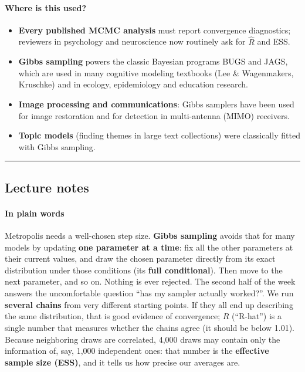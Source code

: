 \paragraph{Where is this used?}

\begin{itemize}
\tightlist
\item
  \textbf{Every published MCMC analysis} must report convergence
  diagnostics; reviewers in psychology and neuroscience now routinely
  ask for \(\hat R\) and ESS.
\item
  \textbf{Gibbs sampling} powers the classic Bayesian programs BUGS and
  JAGS, which are used in many cognitive modeling textbooks (Lee \&
  Wagenmakers, Kruschke) and in ecology, epidemiology and education
  research.
\item
  \textbf{Image processing and communications}: Gibbs samplers have been
  used for image restoration and for detection in multi-antenna (MIMO)
  receivers.
\item
  \textbf{Topic models} (finding themes in large text collections) were
  classically fitted with Gibbs sampling.
\end{itemize}

\begin{center}\rule{0.5\linewidth}{0.5pt}\end{center}


\subsection{Lecture notes}

\paragraph{In plain words}

Metropolis needs a well-chosen step size. \textbf{Gibbs sampling} avoids
that for many models by updating \textbf{one parameter at a time}: fix
all the other parameters at their current values, and draw the chosen
parameter directly from its exact distribution under those conditions
(its \textbf{full conditional}). Then move to the next parameter, and so
on. Nothing is ever rejected. The second half of the week answers the
uncomfortable question ``has my sampler actually worked?''. We run
\textbf{several chains} from very different starting points. If they all
end up describing the same distribution, that is good evidence of
convergence; \(\hat R\) (``R-hat'') is a single number that measures
whether the chains agree (it should be below 1.01). Because neighboring
draws are correlated, 4,000 draws may contain only the information of,
say, 1,000 independent ones: that number is the \textbf{effective sample
size (ESS)}, and it tells us how precise our averages are.

